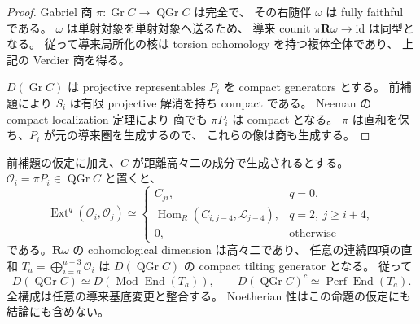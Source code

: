 \begin{proof}
Gabriel 商 $\pi:\operatorname{Gr}C\to\operatorname{QGr}C$ は完全で、
その右随伴 $\omega$ は fully faithful である。
$\omega$ は単射対象を単射対象へ送るため、
導来 counit $\pi\mathbf R\omega\to\mathrm{id}$ は同型となる。
従って導来局所化の核は torsion cohomology を持つ複体全体であり、
上記の Verdier 商を得る。

$D(\operatorname{Gr}C)$ は projective representables $P_i$ を
compact generators とする。
前補題により $S_i$ は有限 projective 解消を持ち compact である。
Neeman \cite[Theorem 2.1]{Neeman1992} の compact localization 定理により
商でも $\pi P_i$ は compact となる。
$\pi$ は直和を保ち、$P_i$ が元の導来圏を生成するので、
これらの像は商も生成する。
\end{proof}

\begin{proposition}
\label{prop:five-window-canonical-tails}
前補題の仮定に加え、$C$ が距離高々二の成分で生成されるとする。
$\mathcal O_i=\pi P_i\in\operatorname{QGr}C$ と置くと、
\[
 \operatorname{Ext}^q(\mathcal O_i,\mathcal O_j)\simeq
 \begin{cases}
 C_{ji},&q=0,\\
 \operatorname{Hom}_R(C_{i,j-4},\mathcal L_{j-4}),&q=2,\ j\ge i+4,\\
 0,&\text{otherwise}
 \end{cases}
 \tag{BW-coh}\label{eq:five-window-tails-cohomology}
\]
である。$\mathbf R\omega$ の cohomological dimension は高々二であり、
任意の連続四項の直和 $T_a=\bigoplus_{i=a}^{a+3}\mathcal O_i$ は
$D(\operatorname{QGr}C)$ の compact tilting generator となる。
従って
\[
 D(\operatorname{QGr}C)\simeq D(\operatorname{Mod}\operatorname{End}(T_a)),
 \qquad D(\operatorname{QGr}C)^c\simeq\operatorname{Perf}\operatorname{End}(T_a).
 \tag{BW-Morita}\label{eq:five-window-tails-morita}
\]
全構成は任意の導来基底変更と整合する。
Noetherian 性はこの命題の仮定にも結論にも含めない。
\end{proposition}

